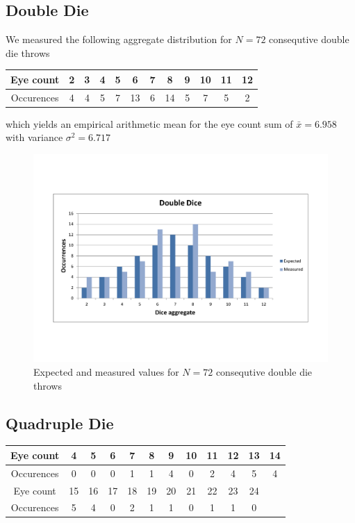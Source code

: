 \documentclass{scrreprt}
\begin{document}
\subsection{Double Die}
We measured the following aggregate distribution for $N=72$ consequtive double die throws
\begin{center}
    \begin{tabular}{|c|ccccccccccc|}
    \hline
    Eye count & 2 & 3 & 4 & 5 & 6 & 7 & 8 & 9 & 10 & 11 & 12\\
    \hline
    Occurences & 4 & 4 & 5 & 7 & 13 & 6 & 14 & 5 & 7 & 5 & 2\\
    \hline
    \end{tabular}
\end{center}
which yields an empirical arithmetic mean for the eye count sum of $\bar{x} = 6.958$ with variance $\sigma^2 = 6.717$

\begin{figure}[H]
    \center   
        \includegraphics[width=1\textwidth]{img/double_dice_combo.pdf}
        \caption{Expected and measured values for $N=72$ consequtive double die throws}
\end{figure}

\subsection{Quadruple Die}

\begin{center}
    \begin{tabular}{|c|ccccccccccc|}
    \hline
    Eye count & 4 & 5 & 6 & 7 & 8 & 9 & 10 & 11 & 12 & 13 & 14\\ 
    \hline
    Occurences & 0 & 0 & 0 & 1 & 1 & 4 & 0 & 2 & 4 & 5 & 4\\
    \hline
    Eye count & 15 & 16 & 17 & 18 & 19 & 20 & 21 & 22 & 23 & 24 &\\
    \hline
    Occurences & 5 & 4 & 0 & 2 & 1 & 1 & 0 & 1 & 1 & 0 &\\
    \hline
    \end{tabular}
\end{center}
\end{document}
